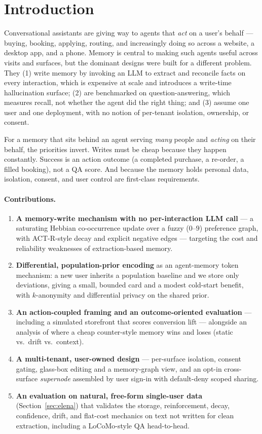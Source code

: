 \documentclass[11pt]{article}
\begin{document}
\section{Introduction}
Conversational assistants are giving way to agents that \emph{act} on a user's behalf
--- buying, booking, applying, routing, and increasingly doing so across a website, a
desktop app, and a phone. Memory is central to making such agents useful across visits
and surfaces, but the dominant designs were built for a different problem. They (1)
write memory by invoking an LLM to extract and reconcile facts on every interaction,
which is expensive at scale and introduces a write-time hallucination surface; (2) are
benchmarked on question-answering, which measures recall, not whether the agent did the
right thing; and (3) assume one user and one deployment, with no notion of per-tenant
isolation, ownership, or consent.

For a memory that sits behind an agent serving \emph{many} people and \emph{acting} on
their behalf, the priorities invert. Writes must be cheap because they happen
constantly. Success is an action outcome (a completed purchase, a re-order, a filled
booking), not a QA score. And because the memory holds personal data, isolation,
consent, and user control are first-class requirements.

\paragraph{Contributions.}
\begin{enumerate}[leftmargin=1.4em,itemsep=2pt]
\item \textbf{A memory-write mechanism with no per-interaction LLM call} --- a
saturating Hebbian co-occurrence update over a fuzzy ($0$--$9$) preference graph, with
ACT-R-style decay and explicit negative edges --- targeting the cost and reliability
weaknesses of extraction-based memory.
\item \textbf{Differential, population-prior encoding} as an agent-memory token
mechanism: a new user inherits a population baseline and we store only deviations,
giving a small, bounded card and a modest cold-start benefit, with $k$-anonymity and
differential privacy on the shared prior.
\item \textbf{An action-coupled framing and an outcome-oriented evaluation} ---
including a simulated storefront that scores conversion lift --- alongside an analysis
of where a cheap counter-style memory wins and loses (static vs.\ drift vs.\ context).
\item \textbf{A multi-tenant, user-owned design} --- per-surface isolation, consent
gating, glass-box editing and a memory-graph view, and an opt-in cross-surface
\emph{supernode} assembled by user sign-in with default-deny scoped sharing.
\item \textbf{An evaluation on natural, free-form single-user data} (Section~\ref{sec:elena})
that validates the storage, reinforcement, decay, confidence, drift, and flat-cost
mechanics on text not written for clean extraction, including a LoCoMo-style QA
head-to-head.
\end{enumerate}
\end{document}
